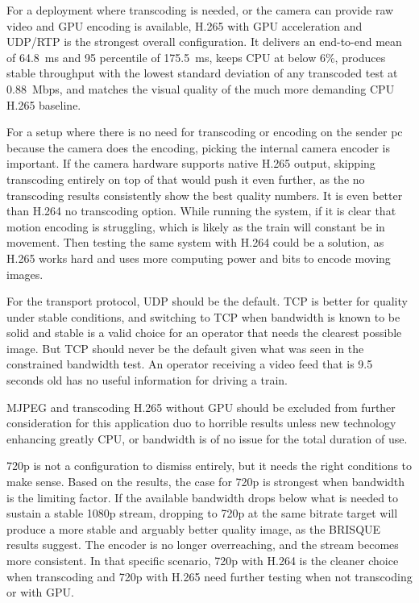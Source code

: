 For a deployment where transcoding is needed, or the camera can provide raw video and GPU encoding is available, H.265 with GPU acceleration and UDP/RTP is the strongest overall configuration. It delivers an end-to-end mean of 64.8~ms and 95 percentile of 175.5~ms, keeps CPU at below 6\%, produces stable throughput with the lowest standard deviation of any transcoded test at 0.88~Mbps, and matches the visual quality of the much more demanding CPU H.265 baseline. 

For a setup where there is no need for transcoding or encoding on the sender pc because the camera does the encoding, picking the internal camera encoder is important. If the camera hardware supports native H.265 output, skipping transcoding entirely on top of that would push it even further, as the no transcoding results consistently show the best quality numbers. It is even better than H.264 no transcoding option. 
While running the system, if it is clear that motion encoding is struggling, which is likely as the train will constant be in movement. Then testing the same system with H.264 could be a solution, as H.265 works hard and uses more computing power and bits to encode moving images. 

For the transport protocol, UDP should be the default. TCP is better for quality under stable conditions, and switching to TCP when bandwidth is known to be solid and stable is a valid choice for an operator that needs the clearest possible image. But TCP should never be the default given what was seen in the constrained bandwidth test. An operator receiving a video feed that is 9.5 seconds old has no useful information for driving a train.

MJPEG and transcoding H.265 without GPU should be excluded from further consideration for this application duo to horrible results unless new technology enhancing greatly CPU, or bandwidth is of no issue for the total duration of use.

720p is not a configuration to dismiss entirely, but it needs the right conditions to make sense. Based on the results, the case for 720p is strongest when bandwidth is the limiting factor. If the available bandwidth drops below what is needed to sustain a stable 1080p stream, dropping to 720p at the same bitrate target will produce a more stable and arguably better quality image, as the BRISQUE results suggest. The encoder is no longer overreaching, and the stream becomes more consistent. In that specific scenario, 720p with H.264 is the cleaner choice when transcoding and 720p with H.265 need further testing when not transcoding or with GPU.

